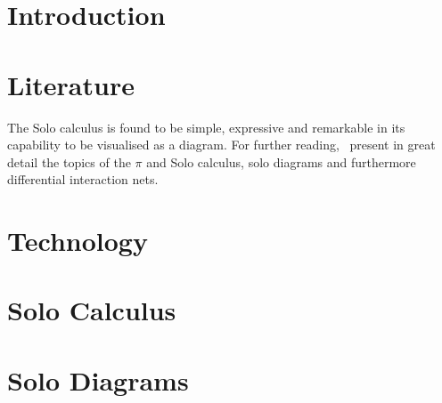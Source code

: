 \documentclass{article}
\begin{document}
    \tableofcontents
    \pagebreak


    \section{Introduction}

    \section{Literature}
        
        
        \begin{remarks} %
            The Solo calculus is found to be simple, expressive and remarkable in its capability to be visualised as a diagram.
            For further reading,~\cite{acyclic-solos} present in great detail the topics of the $\pi$ and Solo calculus, solo diagrams and furthermore differential interaction nets.
        \end{remarks}


    \section{Technology}

    \section{Solo Calculus}
        

    \section{Solo Diagrams}
        
\end{document}
